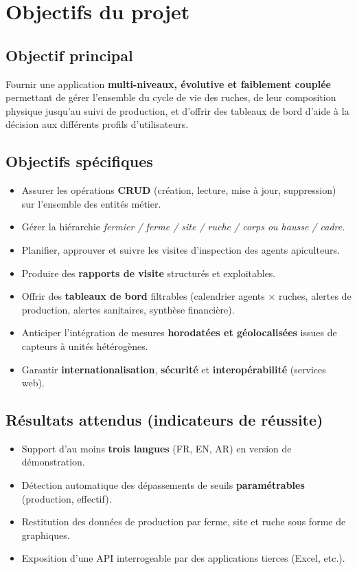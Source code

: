 \chapter{Objectifs du projet}

\section{Objectif principal}
Fournir une application \textbf{multi-niveaux, évolutive et faiblement couplée}
permettant de gérer l'ensemble du cycle de vie des ruches, de leur composition
physique jusqu'au suivi de production, et d'offrir des tableaux de bord d'aide
à la décision aux différents profils d'utilisateurs.

\section{Objectifs spécifiques}
\begin{itemize}
  \item Assurer les opérations \textbf{CRUD} (création, lecture, mise à jour, suppression) sur l'ensemble des entités métier.
  \item Gérer la hiérarchie \emph{fermier / ferme / site / ruche / corps ou hausse / cadre}.
  \item Planifier, approuver et suivre les visites d'inspection des agents apiculteurs.
  \item Produire des \textbf{rapports de visite} structurés et exploitables.
  \item Offrir des \textbf{tableaux de bord} filtrables (calendrier agents × ruches, alertes de production, alertes sanitaires, synthèse financière).
  \item Anticiper l'intégration de mesures \textbf{horodatées et géolocalisées} issues de capteurs à unités hétérogènes.
  \item Garantir \textbf{internationalisation}, \textbf{sécurité} et \textbf{interopérabilité} (services web).
\end{itemize}

\section{Résultats attendus (indicateurs de réussite)}
\begin{itemize}
  \item Support d'au moins \textbf{trois langues} (FR, EN, AR) en version de démonstration.
  \item Détection automatique des dépassements de seuils \textbf{paramétrables} (production, effectif).
  \item Restitution des données de production par ferme, site et ruche sous forme de graphiques.
  \item Exposition d'une API interrogeable par des applications tierces (Excel, etc.).
\end{itemize}

